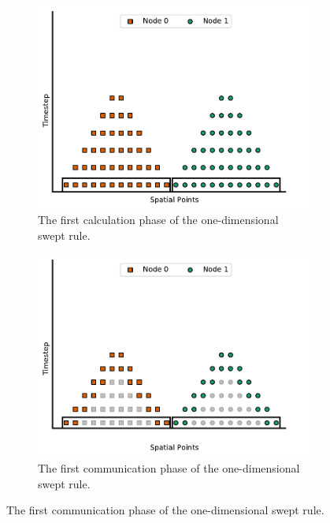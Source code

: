 \documentclass[mca,article,submit,moreauthors,pdftex]{Definitions/mdpi}
\begin{document}
\begin{figure}[htbp]
    \widefigure
    \begin{subfigure}[b]{0.5\textwidth}
        \widefigure
        \includegraphics[scale=0.6]{figs/a_UpTriangle.pdf}
        \caption{The first calculation phase of the one-dimensional swept rule.}
        \label{fig:UpTriangle}
    \end{subfigure}
    \hfill
    \begin{subfigure}[b]{0.45\textwidth}
        \widefigure
        \includegraphics[scale=0.6]{figs/b_Comm1.pdf}
        \caption{The first communication phase of the one-dimensional swept rule.}
        \label{fig:1d-comm-1}
    \end{subfigure}

\end{figure}
\end{document}
